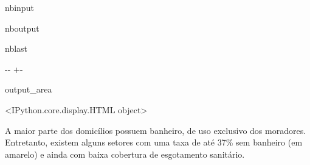 \documentclass[letterpaper,10pt,brazil]{sphinxmanual}
\newlength\nbsphinxcodecellspacing
\begin{document}
\begin{sphinxuseclass}{nbinput}
{
\begin{sphinxVerbatim}[commandchars=\\\{\}]
\llap{\color{nbsphinxin}[10]:\,\hspace{\fboxrule}\hspace{\fboxsep}}   

\end{sphinxVerbatim}
}

\end{sphinxuseclass}
\begin{sphinxuseclass}{nboutput}
\begin{sphinxuseclass}{nblast}
{

\kern-\sphinxverbatimsmallskipamount\kern-\baselineskip
\kern+\FrameHeightAdjust\kern-\fboxrule
\vspace{\nbsphinxcodecellspacing}

\begin{sphinxuseclass}{output_area}
\begin{sphinxuseclass}{}


\begin{sphinxVerbatim}[commandchars=\\\{\}]
\llap{\color{nbsphinxout}[10]:\,\hspace{\fboxrule}\hspace{\fboxsep}}<IPython.core.display.HTML object>
\end{sphinxVerbatim}



\end{sphinxuseclass}
\end{sphinxuseclass}
}

\end{sphinxuseclass}
\end{sphinxuseclass}
\sphinxAtStartPar
A maior parte dos domicílios possuem banheiro, de uso exclusivo dos moradores. Entretanto, existem alguns setores com uma taxa de até 37\% sem banheiro (em amarelo) e ainda com baixa cobertura de esgotamento sanitário.
\end{document}

